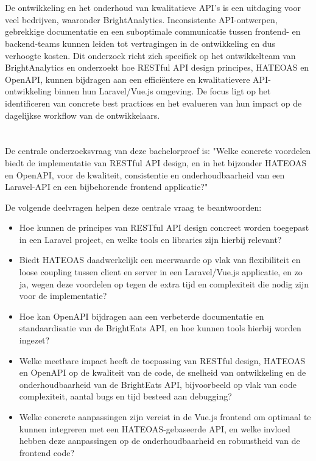 \section{}%
\label{sec:probleemstelling}

De ontwikkeling en het onderhoud van kwalitatieve API's is een uitdaging voor veel bedrijven, waaronder BrightAnalytics. Inconsistente API-ontwerpen, gebrekkige documentatie en een suboptimale communicatie tussen frontend- en backend-teams kunnen leiden tot vertragingen in de ontwikkeling en dus verhoogte kosten. Dit onderzoek richt zich specifiek op het ontwikkelteam van BrightAnalytics en onderzoekt hoe RESTful API design principes, HATEOAS en OpenAPI, kunnen bijdragen aan een efficiëntere en kwalitatievere API-ontwikkeling binnen hun Laravel/Vue.js omgeving. De focus ligt op het identificeren van concrete best practices en het evalueren van hun impact op de dagelijkse workflow van de ontwikkelaars.

\section{}%
\label{sec:onderzoeksvraag}

De centrale onderzoeksvraag van deze bachelorproef is: "Welke concrete voordelen biedt de implementatie van RESTful API design, en in het bijzonder HATEOAS en OpenAPI, voor de kwaliteit, consistentie en onderhoudbaarheid van een Laravel-API en een bijbehorende frontend applicatie?"

De volgende deelvragen helpen deze centrale vraag te beantwoorden:
\begin{itemize}
  \item Hoe kunnen de principes van RESTful API design concreet worden toegepast in een Laravel project, en welke tools en libraries zijn hierbij relevant?
  \item Biedt HATEOAS daadwerkelijk een meerwaarde op vlak van flexibiliteit en loose coupling tussen client en server in een Laravel/Vue.js applicatie, en zo ja, wegen deze voordelen op tegen de extra tijd en complexiteit die nodig zijn voor de implementatie?
  \item Hoe kan OpenAPI bijdragen aan een verbeterde documentatie en standaardisatie van de BrightEats API, en hoe kunnen tools hierbij worden ingezet? 
  \item Welke meetbare impact heeft de toepassing van RESTful design, HATEOAS en OpenAPI op de kwaliteit van de code, de snelheid van ontwikkeling en de onderhoudbaarheid van de BrightEats API, bijvoorbeeld op vlak van code complexiteit, aantal bugs en tijd besteed aan debugging?
  \item Welke concrete aanpassingen zijn vereist in de Vue.js frontend om optimaal te kunnen integreren met een HATEOAS-gebaseerde API, en welke invloed hebben deze aanpassingen op de onderhoudbaarheid en robuustheid van de frontend code?
\end{itemize}

